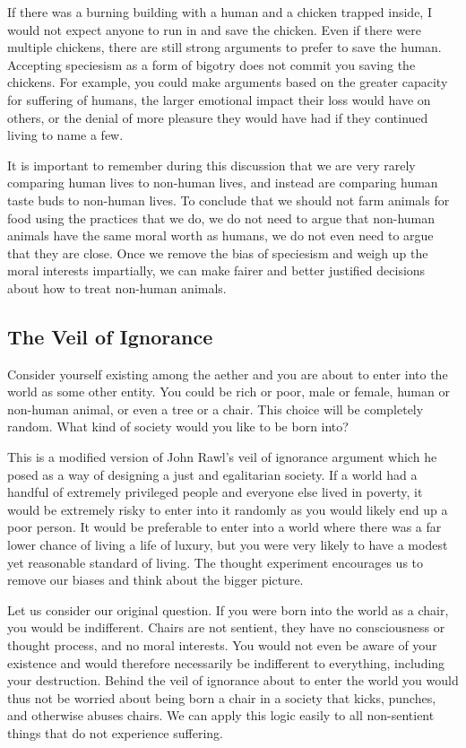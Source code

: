 If there was a burning building with a human and a chicken trapped inside, I would not expect anyone to run in and save the chicken. Even if there were multiple chickens, there are still strong arguments to prefer to save the human. Accepting speciesism as a form of bigotry does not commit you saving the chickens. For example, you could make arguments based on the greater capacity for suffering of humans, the larger emotional impact their loss would have on others, or the denial of more pleasure they would have had if they continued living to name a few.

It is important to remember during this discussion that we are very rarely comparing human lives to non-human lives, and instead are comparing human taste buds to non-human lives. To conclude that we should not farm animals for food using the practices that we do, we do not need to argue that non-human animals have the same moral worth as humans, we do not even need to argue that they are close. Once we remove the bias of speciesism and weigh up the moral interests impartially, we can make fairer and better justified decisions about how to treat non-human animals.

\subsection{The Veil of Ignorance}

Consider yourself existing among the aether and you are about to enter into the world as some other entity. You could be rich or poor, male or female, human or non-human animal, or even a tree or a chair. This choice will be completely random. What kind of society would you like to be born into?

This is a modified version of John Rawl's veil of ignorance argument which he posed as a way of designing a just and egalitarian society. If a world had a handful of extremely privileged people and everyone else lived in poverty, it would be extremely risky to enter into it randomly as you would likely end up a poor person. It would be preferable to enter into a world where there was a far lower chance of living a life of luxury, but you were very likely to have a modest yet reasonable standard of living. The thought experiment encourages us to remove our biases and think about the bigger picture.

Let us consider our original question. If you were born into the world as a chair, you would be indifferent. Chairs are not sentient, they have no consciousness or thought process, and no moral interests. You would not even be aware of your existence and would therefore necessarily be indifferent to everything, including your destruction. Behind the veil of ignorance about to enter the world you would thus not be worried about being born a chair in a society that kicks, punches, and otherwise abuses chairs. We can apply this logic easily to all non-sentient things that do not experience suffering.


